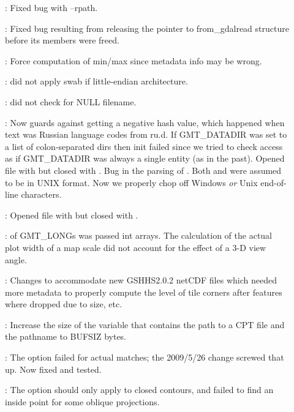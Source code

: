 \begin{description}
	\item []:	Fixed bug with --rpath.
	\item []:	Fixed bug resulting from releasing the pointer to from\_gdalread
		structure before its members were freed.
	\item []:	Force computation of min/max since metadata info may be wrong.
	\item []:	 did not apply swab if little-endian architecture.
	\item []:	 did not check for NULL filename.
	\item []:	Now guards against getting a negative hash value, which happened
		when text was Russian language codes from ru.d.  If GMT\_DATADIR was set to a list of colon-separated dirs
		then init failed since we tried to check access as
		if GMT\_DATADIR was always a single entity (as in the past). Opened file with  but closed with .
		Bug in the parsing of .  Both  and  were
		assumed to be in UNIX format.  Now we properly chop off Windows \emph{or} Unix end-of-line characters.
	\item []:	Opened file with  but closed with .
	\item []:	 of GMT\_LONGs was passed int arrays.  The calculation
		of the actual plot width of a map scale did not account for the effect of a 3-D view angle.
	\item []:		Changes to accommodate new GSHHS2.0.2 netCDF files
		which needed more metadata to properly compute the level of tile corners after features where dropped
		due to size, etc.
	\item []:	Increase the size of the variable that contains the path to
		a CPT file and the pathname to BUFSIZ bytes.
	\item []:	The  option failed for actual matches; the 2009/5/26
		change screwed that up.  Now fixed and tested.
	\item []:	The  option should only apply to closed contours, and
		 failed to find an inside point for some oblique projections.

\end{description}

